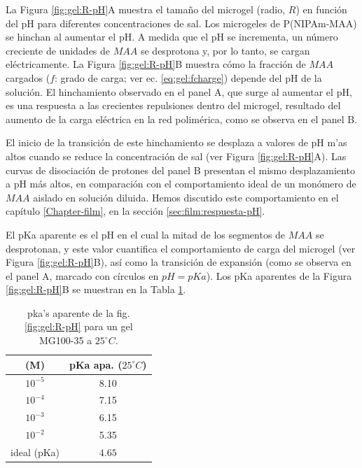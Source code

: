 La Figura \ref{fig:gel:R-pH}A muestra el tama\~no del microgel (radio, $R$) en funci\'on del pH para diferentes concentraciones de sal. Los microgeles de P(NIPAm-MAA) se hinchan al aumentar el pH. A medida que el pH se incrementa, un n\'umero creciente de unidades  de $MAA$ se desprotona y, por lo tanto, se cargan el\'ectricamente. La Figura \ref{fig:gel:R-pH}B muestra c\'omo la fracci\'on de $MAA$ cargados ($f$: grado de carga; ver ec. \ref{eq:gel:fcharge}) depende del pH de la soluci\'on. El hinchamiento observado en el panel A, que surge al aumentar el pH, es una respuesta a las crecientes repulsiones dentro del microgel, resultado del aumento de la carga el\'ectrica en la red polim\'erica, como se observa en el panel B.

El inicio de la transici\'on de este hinchamiento se desplaza a valores de pH m'as altos cuando se reduce la concentraci\'on de sal (ver Figura \ref{fig:gel:R-pH}A). Las curvas de disociaci\'on de protones del panel B presentan el mismo desplazamiento a pH m\'as altos, en comparaci\'on con el comportamiento ideal de un mon\'omero de $MAA$ aislado en soluci\'on diluida. Hemos discutido este comportamiento en el cap\'itulo \ref{Chapter-film}, en la secci\'on \ref{sec:film:respuesta-pH}.

El pKa aparente es el pH en el cual la mitad de los segmentos de $MAA$ se desprotonan, y este valor cuantifica el comportamiento de carga del microgel (ver Figura \ref{fig:gel:R-pH}B), as\'i como la transici\'on de expansi\'on (como se observa en el panel A, marcado con c\'irculos en $pH=pKa$). Los pKa aparentes de la Figura \ref{fig:gel:R-pH}B se muestran en la Tabla \ref{table:gel:pKa_app}.





\begin{table}[!htb]
\centering
\small
  \begin{tabular}{|cc|}
    \hline
      [KCl] (M)&  pKa apa. ($25 ^\circ C$)  \\
      \hline
    $10^{-5}$ & 8.10  \\
    $10^{-4}$ & 7.15 \\
    $10^{-3}$ & 6.15 \\
    $10^{-2}$ & 5.35 \\
    ideal (pKa) &  $4.65$  \\
    \hline
  \end{tabular}
 \caption{ pka's aparente de la fig. \ref{fig:gel:R-pH} para un gel MG100-35 a $25 ^\circ C$.}
\label{table:gel:pKa_app} 
\end{table}


